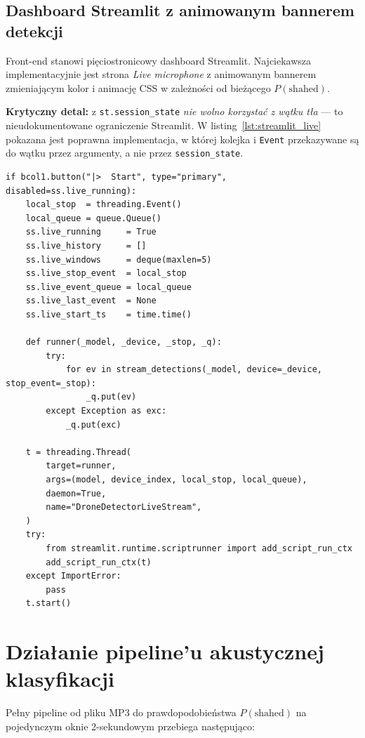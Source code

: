 \documentclass[11pt,a4paper]{article}
\newcommand{\listref}[1]{listing~\ref{#1}}
\begin{document}
\subsection{Dashboard Streamlit z animowanym bannerem detekcji}

Front-end stanowi pięciostronicowy dashboard Streamlit. Najciekawsza
implementacyjnie jest strona \emph{Live microphone} z animowanym bannerem
zmieniającym kolor i animację CSS w zależności od bieżącego $P(\text{shahed})$.

\textbf{Krytyczny detal:} z \texttt{st.session\_state} \emph{nie wolno
korzystać z wątku tła} --- to nieudokumentowane ograniczenie Streamlit. W
\listref{lst:streamlit_live} pokazana jest poprawna implementacja, w której
kolejka i \texttt{Event} przekazywane są do wątku przez argumenty, a nie
przez \texttt{session\_state}.

\begin{lstlisting}[caption={Bezpieczne dla Streamlit wątkowe przechwytywanie
(\texttt{app/streamlit\_app.py}, fragment).},label={lst:streamlit_live}]
if bcol1.button("|>  Start", type="primary", disabled=ss.live_running):
    local_stop  = threading.Event()
    local_queue = queue.Queue()
    ss.live_running     = True
    ss.live_history     = []
    ss.live_windows     = deque(maxlen=5)
    ss.live_stop_event  = local_stop
    ss.live_event_queue = local_queue
    ss.live_last_event  = None
    ss.live_start_ts    = time.time()

    def runner(_model, _device, _stop, _q):
        try:
            for ev in stream_detections(_model, device=_device, stop_event=_stop):
                _q.put(ev)
        except Exception as exc:
            _q.put(exc)

    t = threading.Thread(
        target=runner,
        args=(model, device_index, local_stop, local_queue),
        daemon=True,
        name="DroneDetectorLiveStream",
    )
    try:
        from streamlit.runtime.scriptrunner import add_script_run_ctx
        add_script_run_ctx(t)
    except ImportError:
        pass
    t.start()
\end{lstlisting}

\section{Działanie pipeline'u akustycznej klasyfikacji}
\label{sec:dzialanie}

Pełny pipeline od pliku MP3 do prawdopodobieństwa $P(\text{shahed})$ na
pojedynczym oknie 2-sekundowym przebiega następująco:
\end{document}
